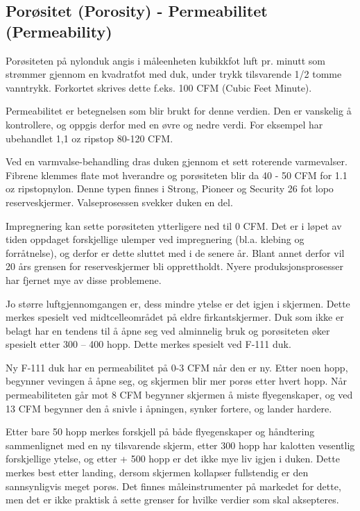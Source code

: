 \subsection{Porøsitet (Porosity) - Permeabilitet (Permeability)}
Porøsiteten på nylonduk angis i måleenheten kubikkfot luft pr. minutt som strømmer gjennom en kvadratfot med duk, under trykk tilsvarende 1/2 tomme vanntrykk. Forkortet skrives dette f.eks. 100 CFM (Cubic Feet Minute).

Permeabilitet er betegnelsen som blir brukt for denne verdien. Den er vanskelig å kontrollere, og oppgis derfor med en øvre og nedre verdi. For eksempel har ubehandlet 1,1 oz ripstop 80-120 CFM.

Ved en varmvalse-behandling dras duken gjennom et sett roterende varmevalser. Fibrene klemmes flate mot hverandre og porøsiteten blir da 40 - 50 CFM for 1.1 oz ripstopnylon. Denne typen finnes i Strong, Pioneer og Security 26 fot lopo reserveskjermer. Valseprosessen svekker duken en del.

Impregnering kan sette porøsiteten ytterligere ned til 0 CFM. Det er i løpet av tiden oppdaget forskjellige ulemper ved impregnering (bl.a. klebing og forråtnelse), og derfor er dette sluttet med i de senere år. Blant annet derfor vil 20 års grensen for reserveskjermer bli opprettholdt. Nyere produksjonsprosesser har fjernet mye av disse problemene.

Jo større luftgjennomgangen er, dess mindre ytelse er det igjen i skjermen. Dette merkes spesielt ved midtcelleområdet på eldre firkantskjermer. Duk som ikke er belagt har en tendens til å åpne seg ved alminnelig bruk og porøsiteten øker spesielt etter 300 – 400 hopp. Dette merkes spesielt ved F-111 duk.

Ny F-111 duk har en permeabilitet på 0-3 CFM når den er ny. Etter noen hopp, begynner vevingen å åpne seg, og skjermen blir mer porøs etter hvert hopp. Når permeabiliteten går mot 8 CFM begynner skjermen å miste flyegenskaper, og ved 13 CFM begynner den å snivle i åpningen, synker fortere, og lander hardere.

Etter bare 50 hopp merkes forskjell på både flyegenskaper og håndtering sammenlignet med en ny tilsvarende skjerm, etter 300 hopp har kalotten vesentlig forskjellige ytelse, og etter + 500 hopp er det ikke mye liv igjen i duken. Dette merkes best etter landing, dersom skjermen kollapser fullstendig er den sannsynligvis meget porøs. Det finnes måleinstrumenter på markedet for dette, men det er ikke praktisk å sette grenser for hvilke verdier som skal aksepteres.

